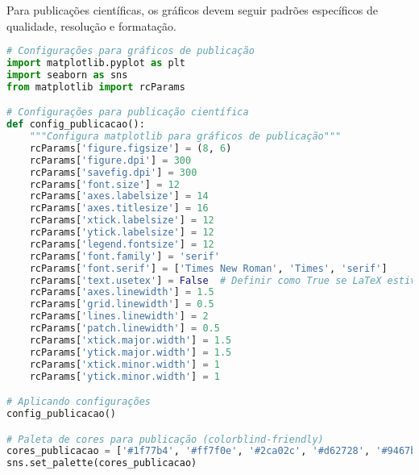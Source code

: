 Para publicações científicas, os gráficos devem seguir padrões específicos de qualidade, resolução e formatação.

\begin{pythonbox}
\begin{lstlisting}[language=Python]
# Configurações para gráficos de publicação
import matplotlib.pyplot as plt
import seaborn as sns
from matplotlib import rcParams

# Configurações para publicação científica
def config_publicacao():
    """Configura matplotlib para gráficos de publicação"""
    rcParams['figure.figsize'] = (8, 6)
    rcParams['figure.dpi'] = 300
    rcParams['savefig.dpi'] = 300
    rcParams['font.size'] = 12
    rcParams['axes.labelsize'] = 14
    rcParams['axes.titlesize'] = 16
    rcParams['xtick.labelsize'] = 12
    rcParams['ytick.labelsize'] = 12
    rcParams['legend.fontsize'] = 12
    rcParams['font.family'] = 'serif'
    rcParams['font.serif'] = ['Times New Roman', 'Times', 'serif']
    rcParams['text.usetex'] = False  # Definir como True se LaTeX estiver disponível
    rcParams['axes.linewidth'] = 1.5
    rcParams['grid.linewidth'] = 0.5
    rcParams['lines.linewidth'] = 2
    rcParams['patch.linewidth'] = 0.5
    rcParams['xtick.major.width'] = 1.5
    rcParams['ytick.major.width'] = 1.5
    rcParams['xtick.minor.width'] = 1
    rcParams['ytick.minor.width'] = 1

# Aplicando configurações
config_publicacao()

# Paleta de cores para publicação (colorblind-friendly)
cores_publicacao = ['#1f77b4', '#ff7f0e', '#2ca02c', '#d62728', '#9467bd', '#8c564b']
sns.set_palette(cores_publicacao)
\end{lstlisting}
\end{pythonbox}

